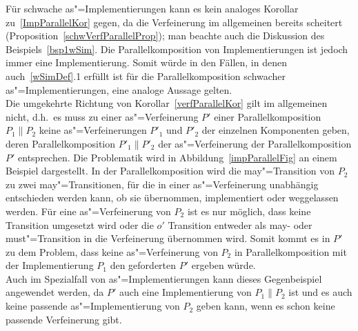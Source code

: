 Für schwache as"=Implementierungen kann es kein analoges Korollar
zu~\ref{ImpParallelKor} gegen, da die Verfeinerung im allgemeinen bereits
scheitert (Proposition~\ref{schwVerfParallelProp}); man beachte auch die
Diskussion des Beispiels~\ref{bsp1wSim}. Die Parallelkomposition von
Implementierungen ist jedoch immer eine Implementierung. Somit würde in den
Fällen, in denen auch~\ref{wSimDef}.1 erfüllt ist für die Parallelkomposition
schwacher as"=Implementierungen, eine analoge Aussage gelten.\\
Die umgekehrte Richtung von Korollar~\ref{verfParallelKor} gilt im
allgemeinen nicht, d.h.\ es muss zu einer as"=Verfeinerung $P'$ einer
Parallelkomposition $P_1\|P_2$ keine as"=Verfeinerungen $P'_1$ und $P'_2$ der
einzelnen Komponenten geben, deren Parallelkomposition $P'_1\|P'_2$ der
as"=Verfeinerung der Parallelkomposition $P'$ entsprechen. Die Problematik wird
in Abbildung~\ref{impParallelFig} an einem Beispiel dargestellt. In der
Parallelkomposition wird die may"=Transition von $P_2$ zu zwei
may"=Transitionen, für die in einer as"=Verfeinerung unabhängig entschieden
werden kann, ob sie übernommen, implementiert oder weggelassen werden. Für eine
as"=Verfeinerung von $P_2$ ist es nur möglich, dass keine Transition umgesetzt
wird oder die $o'$ Transition entweder als may- oder must"=Transition in die
Verfeinerung übernommen wird. Somit kommt es in $P'$ zu dem Problem, dass keine
as"=Verfeinerung von $P_2$ in Parallelkomposition mit der Implementierung
$P_1$ den geforderten \MEIO{} $P'$ ergeben würde.\\
Auch im Spezialfall von as"=Implementierungen kann dieses Gegenbeispiel
angewendet werden, da $P'$ auch eine Implementierung von $P_1\|P_2$ ist und es
auch keine passende as"=Implementierung von $P_2$ geben kann, wenn es schon
keine passende Verfeinerung gibt.

